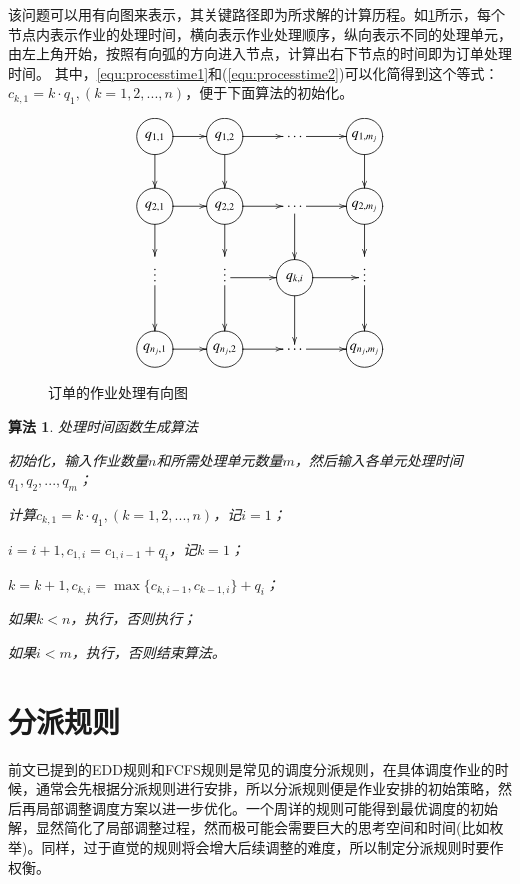 该问题可以用有向图来表示，其关键路径即为所求解的计算历程。如\ref{fig:directedgraph}所示，每个节点内表示作业的处理时间，横向表示作业处理顺序，纵向表示不同的处理单元，由左上角开始，按照有向弧的方向进入节点，计算出右下节点的时间即为订单处理时间。
其中，\eqref{equ:processtime1}和(\ref{equ:processtime2})可以化简得到这个等式：$c_{k,1} = k\cdot q_1,(k = 1,2,...,n)$，便于下面算法的初始化。
\begin{figure}[h]
\newcommand{\process}[1]{*++=[o][F]{\makebox[2em]{$#1$}}}
\begin{equation*}
\xymatrix{
\process{q_{1,1}} \ar[r] \ar[d] & \process{q_{1,2}} \ar[d] \ar[r] & \cdots\ar[r] & \process{q_{1,m_j}} \ar[d]\\
\process{q_{2,1}} \ar[r]\ar[d] & \process{q_{2,2}} \ar[d]\ar[r] & \cdots \ar[r] \ar[d]& \process{q_{2,m_j}} \ar[d] \\
\vdots\ar[d] & \vdots \ar[d]\ar[r] & \process{q_{k,i}}\ar[r]\ar[d] &\vdots \ar[d]\\
\process{q_{n_j,1}} \ar[r] & \process{q_{n_j,2}} \ar[r] & \cdots\ar[r] & \process{q_{n_j,m_j}}
}
\end{equation*}
\caption{订单的作业处理有向图\label{fig:directedgraph}}
\end{figure}

\theoremheaderfont{\heiti}
\newtheorem{algori}[algor]{算法}%
\begin{algori}
处理时间函数生成算法\label{alg:processtime}

\begin{asparaenum}
\renewcommand{\labelenumi}{\bf Step\theenumi~}
\item 初始化，输入作业数量$n$和所需处理单元数量$m$，然后输入各单元处理时间$q_1,q_2,...,q_m$；
\item 计算$c_{k,1} = k\cdot q_1,(k = 1,2,...,n)$，记$i = 1$；
\item $i = i + 1, c_{1,i} = c_{1,i-1} + q_i$，记$k = 1$；
\item $k = k + 1, c_{k,i} = \max\{c_{k,i-1}, c_{k-1,i}\} + q_i$；
\item 如果$k<n$，执行，否则执行；
\item 如果$i<m$，执行，否则结束算法。
\end{asparaenum}
\end{algori}

\section{分派规则}
前文已提到的EDD规则和FCFS规则是常见的调度分派规则，在具体调度作业的时候，通常会先根据分派规则进行安排，所以分派规则便是作业安排的初始策略，然后再局部调整调度方案以进一步优化。一个周详的规则可能得到最优调度的初始解，显然简化了局部调整过程，然而极可能会需要巨大的思考空间和时间(比如枚举)。同样，过于直觉的规则将会增大后续调整的难度，所以制定分派规则时要作权衡。
